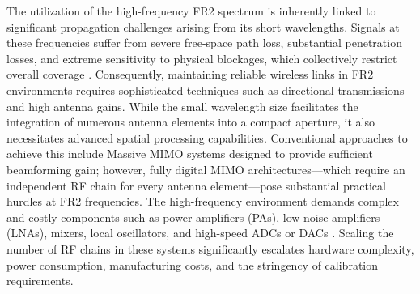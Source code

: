 The utilization of the high-frequency FR2 spectrum is inherently linked to significant propagation challenges arising from its short wavelengths. Signals at these frequencies suffer from severe free-space path loss, substantial penetration losses, and extreme sensitivity to physical blockages, which collectively restrict overall coverage \cite{Zeng2016}. Consequently, maintaining reliable wireless links in FR2 environments requires sophisticated techniques such as directional transmissions and high antenna gains. While the small wavelength size facilitates the integration of numerous antenna elements into a compact aperture, it also necessitates advanced spatial processing capabilities. Conventional approaches to achieve this include Massive MIMO systems designed to provide sufficient beamforming gain; however, fully digital MIMO architectures—which require an independent RF chain for every antenna element—pose substantial practical hurdles at FR2 frequencies. The high-frequency environment demands complex and costly components such as power amplifiers (PAs), low-noise amplifiers (LNAs), mixers, local oscillators, and high-speed ADCs or DACs \cite{Heath2016}. Scaling the number of RF chains in these systems significantly escalates hardware complexity, power consumption, manufacturing costs, and the stringency of calibration requirements.



